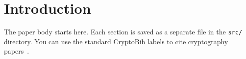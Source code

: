 \section{Introduction}

The paper body starts here. Each section is saved as a separate file in the \texttt{src/} directory. You can use the standard CryptoBib labels to cite cryptography papers~\cite{C:Shamir85}. 